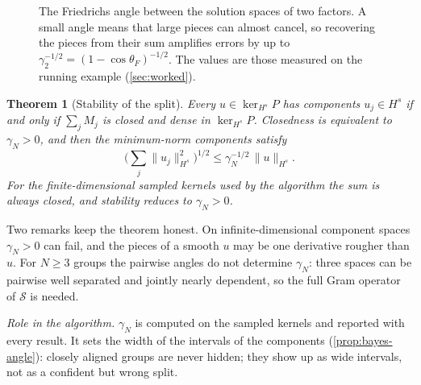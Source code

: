 \documentclass[11pt]{article}
\theoremstyle{plain}
\newtheorem{theorem}{Theorem}[section]
\theoremstyle{definition}
\theoremstyle{remark}
\newcommand{\sumop}{\mathcal{S}}            %
\newcommand{\cF}{c_{F}}                     %
\newcommand{\thetaF}{\theta_{F}}            %
\newcommand{\gN}{\gamma_{N}}                %
\newcommand{\Hs}{H^{s}}                     %
\newcommand{\norm}[1]{\lVert#1\rVert}
\newcommand{\roleinalg}[1]{\par\noindent\emph{Role in the algorithm.} #1\par}
\begin{document}
\begin{figure}[tbp]
\centering
{}
\caption{The Friedrichs angle between the solution spaces of two factors. A small angle means that large pieces can
almost cancel, so recovering the pieces from their sum amplifies errors by up to $\gamma_2^{-1/2}=(1-\cos\thetaF)^{-1/2}$.
The values are those measured on the running example (\cref{sec:worked}).}\label{fig:friedrichs}
\end{figure}

\begin{theorem}[Stability of the split]\label{thm:hm}
Every $u\in\ker_{\Hs}P$ has components $u_j\in\Hs$ if and only if $\sum_jM_j$ is closed and dense in $\ker_{\Hs}P$.
Closedness is equivalent to $\gN>0$, and then the minimum-norm components satisfy
\begin{equation}\label{eq:hm}
  \Big(\sum_j\norm{u_j}_{\Hs}^2\Big)^{1/2}\le\gN^{-1/2}\,\norm{u}_{\Hs}.
\end{equation}
For the finite-dimensional sampled kernels used by the algorithm the sum is always closed, and stability reduces to
$\gN>0$.
\end{theorem}

Two remarks keep the theorem honest. On infinite-dimensional component spaces $\gN>0$ can fail, and the pieces of a
smooth $u$ may be one derivative rougher than $u$. For $N\ge3$ groups the pairwise angles do not determine $\gN$: three
spaces can be pairwise well separated and jointly nearly dependent, so the full Gram operator of $\sumop$ is needed.

\roleinalg{$\gN$ is computed on the sampled kernels and reported with every result. It sets the width of the intervals of
the components (\cref{prop:bayes-angle}): closely aligned groups are never hidden; they show up as wide intervals,
not as a confident but wrong split.}
\end{document}
